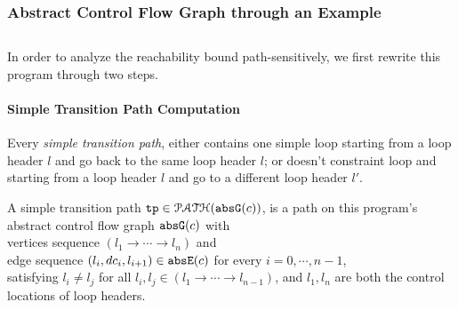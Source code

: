 \subsubsection{Abstract Control Flow Graph through an Example}
\label{sec:abscfg_example}
% 
%

%
\subsection{}
\label{sec:pathsensitive_rb-refine}
In order to analyze the reachability bound path-sensitively, we first rewrite this program through two steps.

  \paragraph{Simple Transition Path Computation}
%
Every \emph{simple transition path},
either contains one simple loop starting from a loop header $l$ and go back to the same loop header $l$;
or doesn't constraint loop and starting from a loop header $l$ and go to a different loop header $l'$.
  \begin{defn}
  A simple transition path
  $\mathtt{tp} \in \mathcal{PATH}(\mathtt{abs}{\mathtt{G}}(c))$, is a path on this program's abstract control flow graph $\mathtt{abs}{\mathtt{G}}(c)$ with 
  \\
  vertices sequence $(l_1 \to \cdots \to l_n)$ and
  \\
  edge sequence $(l_i, dc_i, l_{i + 1}) \in \mathtt{abs}{\mathtt{E}}(c)$ for every $i = 0, \cdots, n-1$,
  \\
  satisfying $l_i \neq l_j$ for all $l_i, l_j \in (l_1 \to \cdots \to l_{n - 1})$,
  and $l_1, l_n$ are both the control locations of loop headers.
  \end{defn}


